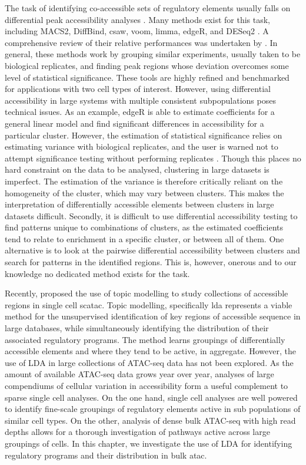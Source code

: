 The task of identifying co-accessible sets of regulatory elements usually falls on differential peak accessibility analyses \cite{Yan2020}. Many methods exist for this task, including MACS2, DiffBind, csaw, voom, limma, edgeR, and DESeq2 \cite{Ritchie2015,Law2014,Love2014,Robinson2009,StarkRandBrown2016,Lun2015,Zhang2008}. A comprehensive review of their relative performances was undertaken by \textcite{Reske2020}. In general, these methods work by grouping similar experiments, usually taken to be biological replicates, and finding peak regions whose deviation overcomes some level of statistical significance. These tools are highly refined and benchmarked for applications with two cell types of interest. However, using differential accessibility in large systems with multiple consistent subpopulations poses technical issues. As an example, edgeR is able to estimate coefficients for a general linear model and find significant differences in accessibility for a particular cluster. However, the estimation of statistical significance relies on estimating variance with biological replicates, and the user is warned not to attempt significance testing without performing replicates \cite{Robinson2009}. Though this places no hard constraint on the data to be analysed, clustering in large datasets is imperfect. The estimation of the variance is therefore critically reliant on the homogeneity of the cluster, which may vary between clusters. This makes the interpretation of differentially accessible elements between clusters in large datasets difficult. Secondly, it is difficult to use differential accessibility testing to find patterns unique to combinations of clusters, as the estimated coefficients tend to relate to enrichment in a specific cluster, or between all of them. One alternative is to look at the pairwise differential accessibility between clusters and search for patterns in the identified regions. This is, however, onerous and to our knowledge no dedicated method exists for the task.  

Recently, \textcite{BravoGonzalez-Blas2019} proposed the use of topic modelling to study collections of accessible regions in single cell \gls{scatac}. Topic modelling, specifically \gls{lda} represents a viable method for the unsupervised identification of key regions of accessible sequence in large databases, while simultaneously identifying the distribution of their associated regulatory programs. The method learns groupings of differentially accessible elements and where they tend to be active, in aggregate. However, the use of LDA in large collections of ATAC-seq data has not been explored. As the amount of available ATAC-seq data grows year over year, analyses of large compendiums of cellular variation in accessibility form a useful complement to sparse single cell analyses. On the one hand, single cell analyses are well powered to identify fine-scale groupings of regulatory elements active in sub populations of similar cell types. On the other, analysis of dense bulk ATAC-seq with high read depths allows for a thorough investigation of pathways active across large groupings of cells. In this chapter, we investigate the use of LDA for identifying regulatory programs and their distribution in bulk \gls{atac}.

